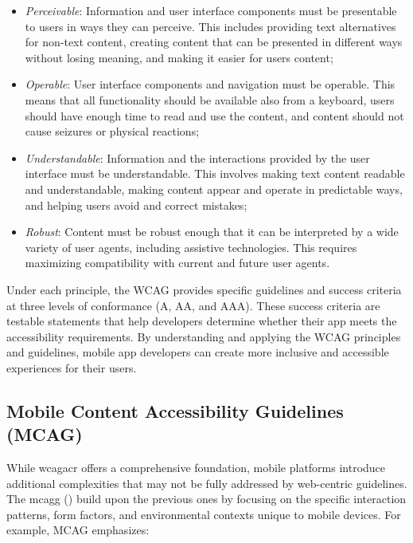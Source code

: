 \begin{itemize}
    \item \textit{Perceivable}: Information and user interface components must be presentable to users in ways they can perceive. This includes providing text alternatives for non-text content, creating content that can be presented in different ways without losing meaning, and making it easier for users content;
    
    \item \textit{Operable}: User interface components and navigation must be operable. This means that all functionality should be available also from a keyboard, users should have enough time to read and use the content, and content should not cause seizures or physical reactions;
    
    \item \textit{Understandable}: Information and the interactions provided by the user interface must be understandable. This involves making text content readable and understandable, making content appear and operate in predictable ways, and helping users avoid and correct mistakes;
    
    \item \textit{Robust}: Content must be robust enough that it can be interpreted by a wide variety of user agents, including assistive technologies. This requires maximizing compatibility with current and future user agents.
\end{itemize}

Under each principle, the WCAG provides specific guidelines and success criteria at three levels of conformance (A, AA, and AAA). These success criteria are testable statements that help developers determine whether their app meets the accessibility requirements. By understanding and applying the WCAG principles and guidelines, mobile app developers can create more inclusive and accessible experiences for their users.

\subsection{Mobile Content Accessibility Guidelines (MCAG)}

While \acrshort{wcagacr} offers a comprehensive foundation, mobile platforms introduce additional complexities that may not be fully addressed by web-centric guidelines. The \gls{mcagg} (\cite{site:mcag}) build upon the previous ones by focusing on the specific interaction patterns, form factors, and environmental contexts unique to mobile devices. For example, MCAG emphasizes:

